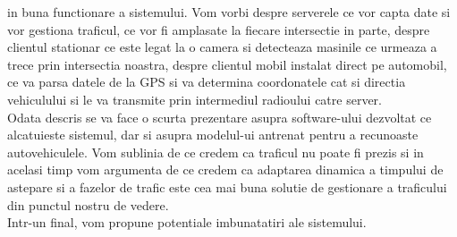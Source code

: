 \documentclass[17pt]{report}
\begin{document}
in buna functionare a sistemului. Vom vorbi despre serverele ce vor capta 
date si vor gestiona traficul, ce vor fi amplasate la fiecare intersectie 
in parte, despre clientul stationar ce este legat la o camera si
detecteaza masinile ce urmeaza a trece prin intersectia noastra, despre 
clientul mobil instalat direct pe automobil, ce va parsa datele de la
GPS si va determina coordonatele cat si directia vehiculului si le va 
transmite prin intermediul radioului catre server. \\
\indent \indent 
Odata descris se va face o scurta prezentare asupra software-ului 
dezvoltat ce alcatuieste sistemul, dar si asupra modelul-ui antrenat
pentru a recunoaste autovehiculele. Vom sublinia de ce credem ca
traficul nu poate fi prezis si in acelasi timp vom argumenta de ce
credem ca adaptarea dinamica a timpului de astepare si a fazelor de trafic
este cea mai buna solutie de gestionare a traficului din punctul nostru 
de vedere.\\
\indent \indent
Intr-un final, vom propune potentiale imbunatatiri ale sistemului.
\pagebreak

\tableofcontents

\pagebreak

\listoffigures
\pagebreak
\end{document}
